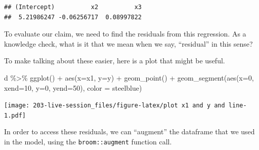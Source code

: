\documentclass[
]{book}
\newenvironment{Shaded}{\begin{snugshade}}{\end{snugshade}}
\newcommand{\AttributeTok}[1]{\textcolor[rgb]{0.77,0.63,0.00}{#1}}
\newcommand{\DecValTok}[1]{\textcolor[rgb]{0.00,0.00,0.81}{#1}}
\newcommand{\FunctionTok}[1]{\textcolor[rgb]{0.00,0.00,0.00}{#1}}
\newcommand{\NormalTok}[1]{#1}
\newcommand{\OtherTok}[1]{\textcolor[rgb]{0.56,0.35,0.01}{#1}}
\newcommand{\SpecialCharTok}[1]{\textcolor[rgb]{0.00,0.00,0.00}{#1}}
\newcommand{\StringTok}[1]{\textcolor[rgb]{0.31,0.60,0.02}{#1}}
\theoremstyle{definition}
\theoremstyle{definition}
\theoremstyle{definition}
\theoremstyle{definition}
\theoremstyle{remark}
\begin{document}
\begin{verbatim}
## (Intercept)          x2          x3 
##  5.21986247 -0.06256717  0.08997822
\end{verbatim}

To evaluate our claim, we need to find the residuals from this regression. As a knowledge check, what is it that we mean when we say, ``residual'' in this sense?

To make talking about these easier, here is a plot that might be useful.

\begin{Shaded}
\begin{Highlighting}[]
\NormalTok{d }\SpecialCharTok{\%\textgreater{}\%} 
  \FunctionTok{ggplot}\NormalTok{() }\SpecialCharTok{+} 
  \FunctionTok{aes}\NormalTok{(}\AttributeTok{x=}\NormalTok{x1, }\AttributeTok{y=}\NormalTok{y) }\SpecialCharTok{+} 
  \FunctionTok{geom\_point}\NormalTok{() }\SpecialCharTok{+} 
  \FunctionTok{geom\_segment}\NormalTok{(}\FunctionTok{aes}\NormalTok{(}\AttributeTok{x=}\DecValTok{0}\NormalTok{, }\AttributeTok{xend=}\DecValTok{10}\NormalTok{, }\AttributeTok{y=}\DecValTok{0}\NormalTok{, }\AttributeTok{yend=}\DecValTok{50}\NormalTok{), }\AttributeTok{color =} \StringTok{\textquotesingle{}steelblue\textquotesingle{}}\NormalTok{)}
\end{Highlighting}
\end{Shaded}

\texttt{[image: 203-live-session\_files/figure-latex/plot x1 and y and line-1.pdf]}

In order to access these residuals, we can ``augment'' the dataframe that we used in the model, using the \texttt{broom::augment} function call.

\begin{Shaded}
\end{Shaded}
\end{document}
